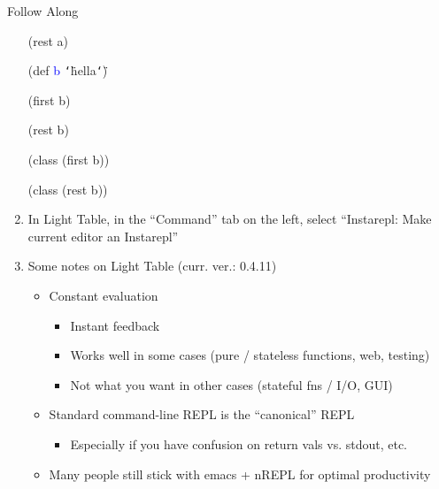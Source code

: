 \documentclass{beamer}
\renewcommand{\textquotedbl}{\texttt{\char`\"}}
\begin{document}
\begin{frame}[allowframebreaks]{Follow Along}
\begin{enumerate}
\begin{small}
{\ttfamily\color{black}
\textcolor[rgb]{0.54901963,0.54901963,0.54901963}{(}\textcolor[rgb]{0.28235295,0.23921569,0.54509807}{rest}
a\textcolor[rgb]{0.54901963,0.54901963,0.54901963}{)}}

{\ttfamily\color{black}
\textcolor[rgb]{0.54901963,0.54901963,0.54901963}{(}\textcolor[rgb]{0.49803922,0.0,0.49803922}{def}
\textcolor{blue}{b}
\textcolor[rgb]{0.54509807,0.13333334,0.32156864}{{\textquotedbl}hella{\textquotedbl}}\textcolor[rgb]{0.54901963,0.54901963,0.54901963}{)}}

{\ttfamily\color{black}
\textcolor[rgb]{0.54901963,0.54901963,0.54901963}{(}\textcolor[rgb]{0.28235295,0.23921569,0.54509807}{first}
b\textcolor[rgb]{0.54901963,0.54901963,0.54901963}{)}}

{\ttfamily\color{black}
\textcolor[rgb]{0.54901963,0.54901963,0.54901963}{(}\textcolor[rgb]{0.28235295,0.23921569,0.54509807}{rest}
b\textcolor[rgb]{0.54901963,0.54901963,0.54901963}{)}}

{\ttfamily\color{black}
\textcolor[rgb]{0.54901963,0.54901963,0.54901963}{(}\textcolor[rgb]{0.28235295,0.23921569,0.54509807}{class}
\textcolor[rgb]{0.54901963,0.54901963,0.54901963}{(}\textcolor[rgb]{0.28235295,0.23921569,0.54509807}{first}
b\textcolor[rgb]{0.54901963,0.54901963,0.54901963}{))}}

{\ttfamily\color{black}
\textcolor[rgb]{0.54901963,0.54901963,0.54901963}{(}\textcolor[rgb]{0.28235295,0.23921569,0.54509807}{class}
\textcolor[rgb]{0.54901963,0.54901963,0.54901963}{(}\textcolor[rgb]{0.28235295,0.23921569,0.54509807}{rest}
b\textcolor[rgb]{0.54901963,0.54901963,0.54901963}{))}}
\end{small}

  \framebreak
  \item In Light Table, in the ``Command'' tab on the left, select
    ``Instarepl: Make current editor an Instarepl''

  \framebreak
  \item Some notes on Light Table (curr. ver.: 0.4.11)
  \begin{itemize}
  \item Constant evaluation
    \begin{itemize}
    \item Instant feedback
    \item Works well in some cases (pure / stateless functions, web,
      testing)
    \item Not what you want in other cases (stateful fns / I/O, GUI)
    \end{itemize}
    \item Standard command-line REPL is the ``canonical'' REPL
      \begin{itemize}
      \item Especially if you have confusion on return vals vs. stdout, etc.
      \end{itemize}
    \item Many people still stick with emacs + nREPL for optimal productivity
  \end{itemize}
  \end{enumerate}
\end{frame}
\end{document}
